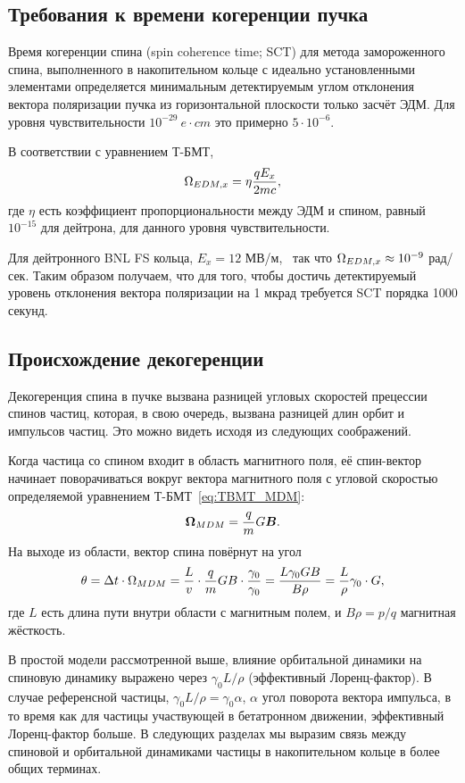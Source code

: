 

\subsection{Требования к времени когеренции пучка}
Время когеренции спина (spin coherence time; SCT) для метода
замороженного спина, выполненного в накопительном кольце с идеально
установленными элементами определяется минимальным детектируемым углом
отклонения вектора поляризации пучка из горизонтальной плоскости
только засчёт ЭДМ. Для уровня чувствительности $10^{-29}~e\cdot cm$
это примерно $5\cdot10^{-6}$.~\cite{BNL:Deuteron2008}

В соответствии с уравнением Т-БМТ,
\[
\Omega_{EDM,x} = \eta\frac{qE_x}{2mc},
\]
где $\eta$ есть коэффициент пропорциональности между ЭДМ и спином,
равный $10^{-15}$ для дейтрона, для данного уровня чувствительности.~\cite[стр.~206]{Eremey:Thesis}

Для дейтронного BNL FS кольца, $E_x = 12$
МВ/м,~\cite[стр.~19]{BNL:Deuteron2008} так что $\Omega_{EDM,x}\approx
10^{-9}$ рад/сек. Таким образом получаем, что для того, чтобы достичь
детектируемый уровень отклонения вектора поляризации на 1 мкрад требуется SCT порядка 1000 секунд.~\cite[стр.~207]{Eremey:Thesis}
\subsection{Происхождение декогеренции}
Декогеренция спина в пучке вызвана разницей угловых скоростей
прецессии спинов частиц, которая, в свою очередь, вызвана разницей
длин орбит и импульсов частиц. Это можно видеть исходя из следующих
соображений.

Когда частица со спином входит в область магнитного поля, её спин-вектор
начинает поворачиваться вокруг вектора магнитного поля с угловой
скоростью определяемой уравнением Т-БМТ~\eqref{eq:TBMT_MDM}:
\begin{equation*}
	\boldsymbol{\Omega}_{MDM} = \frac qm G\boldsymbol B.
\end{equation*}
На выходе из области, вектор спина повёрнут на угол
\begin{equation*}
	\theta = \Delta t\cdot\Omega_{MDM} = \frac Lv \cdot \frac qm GB\cdot \frac{\gamma_0}{\gamma_0} = \frac{L\gamma_0 GB}{B\rho} = \frac L\rho\gamma_0\cdot G,
\end{equation*}
где $L$ есть длина пути внутри области с магнитным полем, и $B\rho =
p/q$ магнитная жёсткость.

В простой модели рассмотренной выше, влияние орбитальной динамики на
спиновую динамику выражено через $\gamma_0 L/\rho$ (эффективный
Лоренц-фактор). В случае референсной частицы, $\gamma_0L/\rho =
\gamma_0\alpha$, $\alpha$ угол поворота вектора импульса, в то время
как для частицы участвующей в бетатронном движении, эффективный
Лоренц-фактор больше. В следующих разделах мы выразим связь между
спиновой и орбитальной динамиками частицы в накопительном кольце в
более общих терминах.

